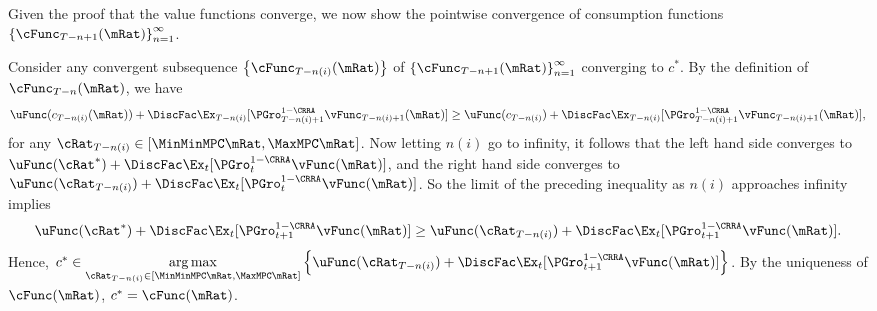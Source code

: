 \documentclass[\econtexRoot/BufferStockTheory]{subfiles}
\begin{document}
Given the proof that the value functions converge, we now show the
pointwise convergence of consumption functions
$\left\{\cFunc_{T-n+1}(\mRat)\right\} _{n=1}^{\infty }$.

Consider any convergent subsequence $\left\{\cFunc_{T-n(i)}(\mRat)\right\}$ of $\left\{\cFunc_{T-n+1}(\mRat)\right\} _{n=1}^{\infty }$ converging to $c^*$. By the definition of $\cFunc_{T-n}(\mRat)$, we have 
\begin{equation}
    \uFunc(c_{T - n(i)}(\mRat)) + \DiscFac \Ex_{T - n(i)}[{\PGro}_{T-n(i)+1}^{1 - \CRRA}\vFunc_{T-n(i)+1}(\mRat)] \geq \uFunc(c_{T - n(i)}) + \DiscFac \Ex_{T - n(i)}[{\PGro}_{T-n(i)+1}^{1 - \CRRA}\vFunc_{T-n(i)+1}(\mRat)],
\end{equation}
for any $\cRat_{T - n(i)} \in [\MinMinMPC \mRat,\MaxMPC \mRat]$. Now letting $n(i)$ go to infinity, it follows that the left hand side converges to $\uFunc(\cRat^*) + \DiscFac \Ex_{t}[{\PGro}_{t}^{1 - \CRRA}\vFunc(\mRat)]$, and the right hand side converges to $\uFunc(\cRat_{T - n(i)}) + \DiscFac \Ex_{t}[{\PGro}_{t}^{1 - \CRRA}\vFunc(\mRat)]$. So the limit of the preceding inequality as $n(i)$ approaches infinity implies 
\begin{equation}
   \uFunc(\cRat^*) + \DiscFac \Ex_{t}[{\PGro}_{t + 1}^{1 - \CRRA}\vFunc(\mRat)] \geq \uFunc(\cRat_{T - n(i)}) + \DiscFac \Ex_{t}[{\PGro}_{t + 1}^{1 - \CRRA}\vFunc(\mRat)].
\end{equation}
Hence, $c^* \in \underset{\cRat_{T - n(i)} \in [\MinMinMPC \mRat,\MaxMPC \mRat]}{\arg \max }\left\{ \uFunc(\cRat_{T - n(i)}) + \DiscFac \Ex_{t}[{\PGro}_{t + 1}^{1 - \CRRA}\vFunc(\mRat)]\right\}$. By the uniqueness of $\cFunc(\mRat)$, $c^* = \cFunc(\mRat)$.
\end{document}
